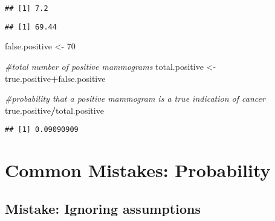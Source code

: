 \documentclass[]{book}
\newenvironment{Shaded}{\begin{snugshade}}{\end{snugshade}}
\newcommand{\KeywordTok}[1]{\textcolor[rgb]{0.13,0.29,0.53}{\textbf{#1}}}
\newcommand{\DecValTok}[1]{\textcolor[rgb]{0.00,0.00,0.81}{#1}}
\newcommand{\FloatTok}[1]{\textcolor[rgb]{0.00,0.00,0.81}{#1}}
\newcommand{\StringTok}[1]{\textcolor[rgb]{0.31,0.60,0.02}{#1}}
\newcommand{\CommentTok}[1]{\textcolor[rgb]{0.56,0.35,0.01}{\textit{#1}}}
\newcommand{\OperatorTok}[1]{\textcolor[rgb]{0.81,0.36,0.00}{\textbf{#1}}}
\newcommand{\NormalTok}[1]{#1}
\theoremstyle{definition}
\theoremstyle{definition}
\theoremstyle{definition}
\theoremstyle{remark}
\begin{document}
\begin{verbatim}
## [1] 7.2
\end{verbatim}

\begin{Shaded}
\end{Shaded}

\begin{verbatim}
## [1] 69.44
\end{verbatim}

\begin{Shaded}
\begin{Highlighting}[]
\NormalTok{false.positive <-}\StringTok{ }\DecValTok{70}

\CommentTok{#total number of positive mammograms}
\NormalTok{total.positive <-}\StringTok{ }\NormalTok{true.positive}\OperatorTok{+}\NormalTok{false.positive}

\CommentTok{#probability that a positive mammogram is a true indication of cancer}
\NormalTok{true.positive}\OperatorTok{/}\NormalTok{total.positive}
\end{Highlighting}
\end{Shaded}

\begin{verbatim}
## [1] 0.09090909
\end{verbatim}

\section{Common Mistakes:
Probability}\label{common-mistakes-probability}

\subsection{Mistake: Ignoring
assumptions}\label{mistake-ignoring-assumptions}
\end{document}
